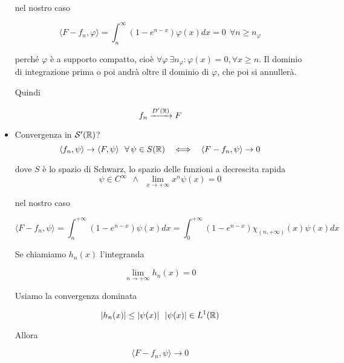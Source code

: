 \begin{itemize}
nel nostro caso

\begin{equation*}
\langle F - f_{n}, \varphi \rangle = \int^{\infty}_{n}\left(1 - e^{n - x}\right) \varphi (x)dx = 0\ \ \forall n \geq n_{\varphi}
\end{equation*}

perché $\varphi $ è a supporto compatto, cioè $\forall \varphi \ \exists n_{\varphi} :\varphi (x) = 0, \forall x \geq n$. Il dominio di integrazione prima o poi andrà oltre il dominio di $\varphi $, che poi si annullerà.

Quindi

\begin{equation*}
f_{n}\xrightarrow{D'(\mathbb{R})} F
\end{equation*}
\item Convergenza in $\mathcal{S} '(\mathbb{R})$?
\begin{equation*}
\langle f_{n}, \psi \rangle \rightarrow \langle F, \psi \rangle \ \ \forall \psi \in S(\RR) \ \ \iff \ \ \langle F - f_{n}, \psi \rangle \rightarrow 0
\end{equation*}

dove $S$ è lo spazio di Schwarz, lo spazio delle funzioni a decrescita rapida
\begin{equation*}
\psi \in C^{\infty} \ \ \land \ \ \lim\limits_{x\rightarrow + \infty} x^{n} \psi (x) = 0
\end{equation*}

nel nostro caso

\begin{equation*}
\langle F - f_{n}, \psi \rangle = \int^{+ \infty}_{n}\left(1 - e^{n - x}\right) \psi (x) dx = \int^{+ \infty}_{0}\left(1 - e^{n - x}\right) \chi_{(n, + \infty)}(x) \psi (x) dx
\end{equation*}

Se chiamiamo $h_{n}(x)$ l'integranda

\begin{equation*}
\lim\limits_{n\rightarrow + \infty} h_{n}(x) = 0
\end{equation*}

Usiamo la convergenza dominata

\begin{equation*}
| h_{n}(x)| \leq | \psi (x)| \ \ | \psi (x)| \in L^{1}(\mathbb{R})
\end{equation*}

Allora

\begin{equation*}
\langle F - f_{n}, \psi \rangle \rightarrow 0
\end{equation*}
\end{itemize}
